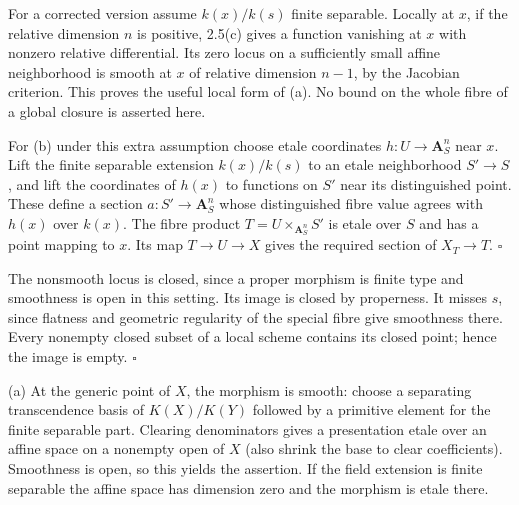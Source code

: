 \documentclass[11pt]{article}
\let\chapterexercise\exercise
\renewcommand{\exercise}[2]{\Needspace{8\baselineskip}\chapterexercise{#1}{#2}}
\begin{document}
For a corrected version assume $k(x)/k(s)$ finite separable. Locally at $x$, if the relative dimension $n$ is positive, 2.5(c) gives a function vanishing at $x$ with nonzero relative differential. Its zero locus on a sufficiently small affine neighborhood is smooth at $x$ of relative dimension $n-1$, by the Jacobian criterion. This proves the useful local form of (a). No bound on the whole fibre of a global closure is asserted here.

For (b) under this extra assumption choose etale coordinates $h:U\to\mathbf A^n_S$ near $x$. Lift the finite separable extension $k(x)/k(s)$ to an etale neighborhood $S'\to S$, and lift the coordinates of $h(x)$ to functions on $S'$ near its distinguished point. These define a section $a:S'\to\mathbf A^n_S$ whose distinguished fibre value agrees with $h(x)$ over $k(x)$. The fibre product $T=U\times_{\mathbf A^n_S}S'$ is etale over $S$ and has a point mapping to $x$. Its map $T\to U\to X$ gives the required section of $X_T\to T$. \hfill$\square$

\pf
The nonsmooth locus is closed, since a proper morphism is finite type and smoothness is open in this setting. Its image is closed by properness. It misses $s$, since flatness and geometric regularity of the special fibre give smoothness there. Every nonempty closed subset of a local scheme contains its closed point; hence the image is empty. \hfill$\square$

\pf
(a) At the generic point of $X$, the morphism is smooth: choose a separating transcendence basis of $K(X)/K(Y)$ followed by a primitive element for the finite separable part. Clearing denominators gives a presentation etale over an affine space on a nonempty open of $X$ (also shrink the base to clear coefficients). Smoothness is open, so this yields the assertion. If the field extension is finite separable the affine space has dimension zero and the morphism is etale there.
\end{document}
